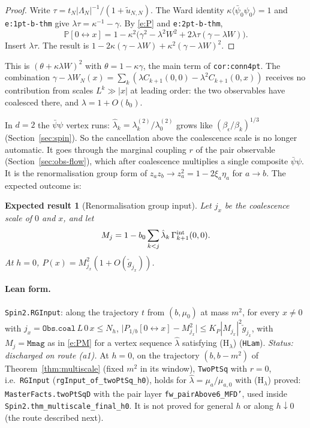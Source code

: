 \documentclass[11pt]{amsart}
\newtheorem{conjecture}[theorem]{Expected result}
\theoremstyle{definition}
\theoremstyle{remark}
\numberwithin{equation}{section}
\newcommand{\Pb}{\mathbb{P}}
\newcommand{\avg}[1]{\langle #1\rangle}
\newcommand{\conn}{\leftrightarrow}
\begin{document}
\begin{proof}
Write $\tau=t_N|\Lambda_N|^{-1}/(1+\tilde u_{N,N})$. The Ward identity
$\kappa\avg{\bar\psi_0\psi_0}=1$ and \texttt{e:1pt-b-thm} give $\lambda\tau=\kappa^{-1}-\gamma$.
By \eqref{e:P} and \texttt{e:2pt-b-thm},
\[
  \Pb[0\conn x]=1-\kappa^2\bigl(\gamma^2-\lambda^2W^2+2\lambda\tau(\gamma-\lambda W)\bigr).
\]
Insert $\lambda\tau$. The result is $1-2\kappa(\gamma-\lambda W)+\kappa^2(\gamma-\lambda W)^2$.
\end{proof}

This is $(\theta+\kappa\lambda W)^2$ with $\theta=1-\kappa\gamma$, the main term of
\texttt{cor:conn4pt}. The combination $\gamma-\lambda W_N(x)=\sum_k(\lambda C_{k+1}(0,0)-\lambda^2C_{k+1}(0,x))$
receives no contribution from scales $L^k\gg|x|$ at leading order: the two observables have
coalesced there, and $\lambda=1+O(b_0)$.

In $d=2$ the $\bar\psi\psi$ vertex runs: $\hat\lambda_k=\lambda^{(2)}_k/\lambda^{(2)}_0$ grows
like $(\beta_\epsilon/\beta_k)^{1/3}$ (Section~\ref{sec:spin}). So the cancellation above the
coalescence scale is no longer automatic. It goes through the marginal coupling $r$ of the pair
observable (Section~\ref{sec:obs-flow}), which after coalescence multiplies a single composite
$\bar\psi\psi$. It is the renormalisation group form of $z_az_b\to z_a^2=1-2\xi_a\eta_a$ for
$a\to b$. The expected outcome is:

\begin{conjecture}[Renormalisation group input]\label{thm:rginput}
Let $j_x$ be the coalescence scale of $0$ and $x$, and let
\begin{equation}\label{e:PM}
  M_j=1-b_0\sum_{k<j}\hat\lambda_k\,\Gamma^{\rm int}_{k+1}(0,0).
\end{equation}
At $h=0$, $P(x)=M_{j_x}^2(1+O(\check g_{j_x}))$.
\end{conjecture}
\paragraph{Lean form.} \texttt{Spin2.RGInput}: along the trajectory $t$ from $(b,\mu_0)$ at mass $m^2$, for every
$x\ne0$ with $j_x=\texttt{Obs.coal}\,L\,0\,x\le N_h$,
$\bigl|P_{1/b}[0\conn x]-M_{j_x}^2\bigr|\le K_P|M_{j_x}|^2\check g_{j_x}$, with $M_j=\texttt{Mmag}$ as in \eqref{e:PM} for a vertex
sequence $\hat\lambda$ satisfying (H$_\lambda$) (\texttt{HLam}). \emph{Status: discharged on route (a1).} At $h=0$, on the
trajectory $(b,b-m^2)$ of Theorem~\ref{thm:multiscale} (fixed $m^2$ in its window), \texttt{TwoPtSq} with $r=0$, i.e.\ \texttt{RGInput}
(\texttt{rgInput\_of\_twoPtSq\_h0}), holds for $\hat\lambda=\mu_a/\mu_{a,0}$ with (H$_\lambda$) proved: \texttt{MasterFacts.twoPtSqD} with the pair
layer \texttt{fw\_pairAbove6\_MFD'}, used inside \texttt{Spin2.thm\_multiscale\_final\_h0}. It is not proved for general $h$ or along
$h\downarrow0$ (the route described next).
\end{document}
